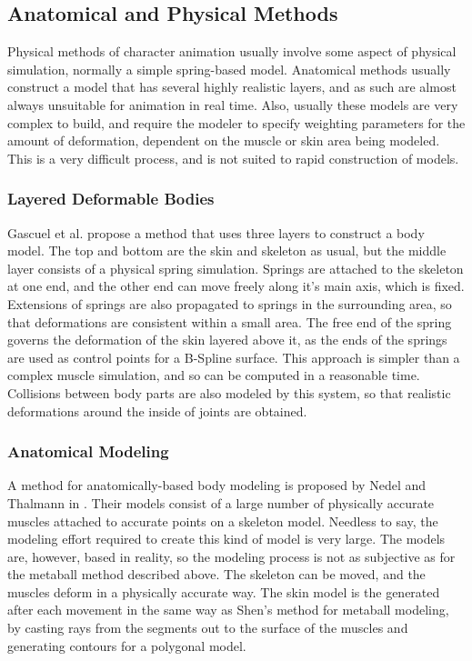 \documentclass[10pt,oneside,fleqn,a4paper]{book}
\begin{document}
\subsection{\label{sec:reviewphysics}Anatomical and Physical Methods}
Physical methods of character animation usually involve some aspect of physical simulation, normally a simple spring-based model. Anatomical methods usually construct a model that has several highly realistic layers, and as such are almost always unsuitable for animation in real time. Also, usually these models are very complex to build, and require the modeler to specify weighting parameters for the amount of deformation, dependent on the muscle or skin area being modeled. This is a very difficult process, and is not suited to rapid construction of models.

\subsubsection{Layered Deformable Bodies}
Gascuel et al. \cite{Gascuel91} propose a method that uses three layers to construct a body model. The top and bottom are the skin and skeleton as usual, but the middle layer consists of a physical spring simulation. Springs are attached to the skeleton at one end, and the other end can move freely along it's main axis, which is fixed. Extensions of springs are also propagated to springs in the surrounding area, so that deformations are consistent within a small area. The free end of the spring governs the deformation of the skin layered above it, as the ends of the springs are used as control points for a B-Spline surface. This approach is simpler than a complex muscle simulation, and so can be computed in a reasonable time. Collisions between body parts are also modeled by this system, so that realistic deformations around the inside of joints are obtained.

\subsubsection{Anatomical Modeling}
A method for anatomically-based body modeling is proposed by Nedel and Thalmann in \cite{Nedel98}. Their models consist of a large number of physically accurate muscles attached to accurate points on a skeleton model. Needless to say, the modeling effort required to create this kind of model is very large. The models are, however, based in reality, so the modeling process is not as subjective as for the metaball method described above. The skeleton can be moved, and the muscles deform in a physically accurate way. The skin model is the generated after each movement in the same way as Shen's method for metaball modeling, by casting rays from the segments out to the surface of the muscles and generating contours for a polygonal model.
\end{document}
